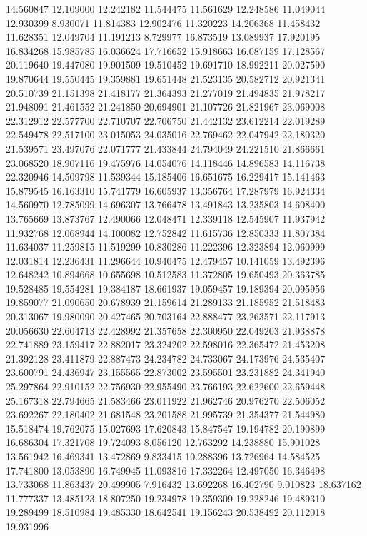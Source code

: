 14.560847
12.109000
12.242182
11.544475
11.561629
12.248586
11.049044
12.930399
8.930071
11.814383
12.902476
11.320223
14.206368
11.458432
11.628351
12.049704
11.191213
8.729977
16.873519
13.089937
17.920195
16.834268
15.985785
16.036624
17.716652
15.918663
16.087159
17.128567
20.119640
19.447080
19.901509
19.510452
19.691710
18.992211
20.027590
19.870644
19.550445
19.359881
19.651448
21.523135
20.582712
20.921341
20.510739
21.151398
21.418177
21.364393
21.277019
21.494835
21.978217
21.948091
21.461552
21.241850
20.694901
21.107726
21.821967
23.069008
22.312912
22.577700
22.710707
22.706750
21.442132
23.612214
22.019289
22.549478
22.517100
23.015053
24.035016
22.769462
22.047942
22.180320
21.539571
23.497076
22.071777
21.433844
24.794049
24.221510
21.866661
23.068520
18.907116
19.475976
14.054076
14.118446
14.896583
14.116738
22.320946
14.509798
11.539344
15.185406
16.651675
16.229417
15.141463
15.879545
16.163310
15.741779
16.605937
13.356764
17.287979
16.924334
14.560970
12.785099
14.696307
13.766478
13.491843
13.235803
14.608400
13.765669
13.873767
12.490066
12.048471
12.339118
12.545907
11.937942
11.932768
12.068944
14.100082
12.752842
11.615736
12.850333
11.807384
11.634037
11.259815
11.519299
10.830286
11.222396
12.323894
12.060999
12.031814
12.236431
11.296644
10.940475
12.479457
10.141059
13.492396
12.648242
10.894668
10.655698
10.512583
11.372805
19.650493
20.363785
19.528485
19.554281
19.384187
18.661937
19.059457
19.189394
20.095956
19.859077
21.090650
20.678939
21.159614
21.289133
21.185952
21.518483
20.313067
19.980090
20.427465
20.703164
22.888477
23.263571
22.117913
20.056630
22.604713
22.428992
21.357658
22.300950
22.049203
21.938878
22.741889
23.159417
22.882017
23.324202
22.598016
22.365472
21.453208
21.392128
23.411879
22.887473
24.234782
24.733067
24.173976
24.535407
23.600791
24.436947
23.155565
22.873002
23.595501
23.231882
24.341940
25.297864
22.910152
22.756930
22.955490
23.766193
22.622600
22.659448
25.167318
22.794665
21.583466
23.011922
21.962746
20.976270
22.506052
23.692267
22.180402
21.681548
23.201588
21.995739
21.354377
21.544980
15.518474
19.762075
15.027693
17.620843
15.847547
19.194782
20.190899
16.686304
17.321708
19.724093
8.056120
12.763292
14.238880
15.901028
13.561942
16.469341
13.472869
9.833415
10.288396
13.726964
14.584525
17.741800
13.053890
16.749945
11.093816
17.332264
12.497050
16.346498
13.733068
11.863437
20.499905
7.916432
13.692268
16.402790
9.010823
18.637162
11.777337
13.485123
18.807250
19.234978
19.359309
19.228246
19.489310
19.289499
18.510984
19.485330
18.642541
19.156243
20.538492
20.112018
19.931996
